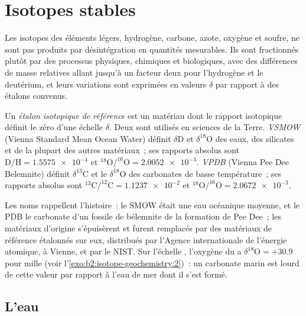 \section{Isotopes stables}

Les isotopes des éléments légers, hydrogène, carbone, azote, oxygène et
soufre, ne sont pas produits par désintégration en quantités mesurables. Ils sont fractionnés
plutôt par des processus physiques, chimiques et biologiques, avec des différences de masse relatives
allant jusqu'à un facteur deux pour l'hydrogène et le deutérium, et leurs
variations sont exprimées en valeurs $\delta$ par rapport à des étalons convenus.

\begin{definition}\label{def:b2:isotope-geochemistry:standards}
Un \emph{étalon isotopique de référence} est un
matériau dont le rapport isotopique définit le zéro d'une échelle $\delta$. Deux sont utilisés
en sciences de la Terre. \emph{VSMOW} (Vienna Standard Mean Ocean
Water) définit $\delta\mathrm{D}$ et $\delta^{18}\mathrm{O}$ des eaux, des silicates et de la
plupart des autres matériaux~; ses rapports absolus sont $\mathrm{D}/\mathrm{H} =
\num{1.5575e-4}$ et $^{18}\mathrm{O}/^{16}\mathrm{O} = \num{2.0052e-3}$.
\emph{VPDB} (Vienna Pee Dee Belemnite) définit $\delta^{13}\mathrm{C}$
et le $\delta^{18}\mathrm{O}$ des carbonates de basse température~; ses rapports absolus
sont $^{13}\mathrm{C}/^{12}\mathrm{C} = \num{1.1237e-2}$ et
$^{18}\mathrm{O}/^{16}\mathrm{O} = \num{2.0672e-3}$.
\end{definition}

Les noms rappellent l'histoire~: le SMOW était une eau océanique moyenne, et le PDB le
carbonate d'un fossile de bélemnite de la formation de Pee Dee~; les matériaux
d'origine s'épuisèrent et furent remplacés par des matériaux de référence étalonnés sur eux,
distribués par l'Agence internationale de l'énergie atomique, à Vienne, et par le NIST.
Sur l'échelle , l'oxygène du  a $\delta^{18}\mathrm{O} = +30.9$ pour mille
(voir l'\cref{exo:b2:isotope-geochemistry:2})~: un carbonate marin est
lourd de cette valeur par rapport à l'eau de mer dont il s'est formé.

\subsection{L'eau}

